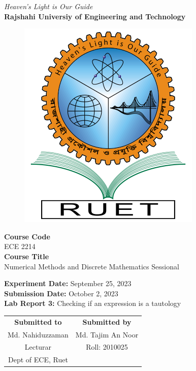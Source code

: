 \vspace*{\fill}
\begin{center}

    \emph{Heaven's Light is Our Guide} \\
    \textbf{Rajshahi Universiy of Engineering and Technology} \\

    \begin{figure}[h]
        \centering
        \includegraphics[scale=.34]{images/RUET_logo.png}
        \label{fig:ruet_logo}
    \end{figure}
    \vspace{5mm}

    \textbf{Course Code}\\
    ECE 2214\\
    \vspace{3mm}
    \textbf{Course Title}\\
    Numerical Methods and Discrete Mathematics Sessional

    \vspace{5mm}
    \textbf{Experiment Date:} September 25, 2023\\
    \textbf{Submission Date:} {October 2, 2023}\\

    \vspace{5mm}
    \textbf{Lab Report 3:} Checking if an expression is a tautology\\

    \vspace{15mm}

    \begin{tabular}{c|c}
        \textbf{Submitted to} & \textbf{Submitted by} \\
        Md. Nahiduzzaman      & Md. Tajim An Noor     \\
        Lecturar              & Roll: 2010025         \\
        Dept of ECE, Ruet     &                       \\
    \end{tabular}

\end{center}
\vspace*{\fill}
